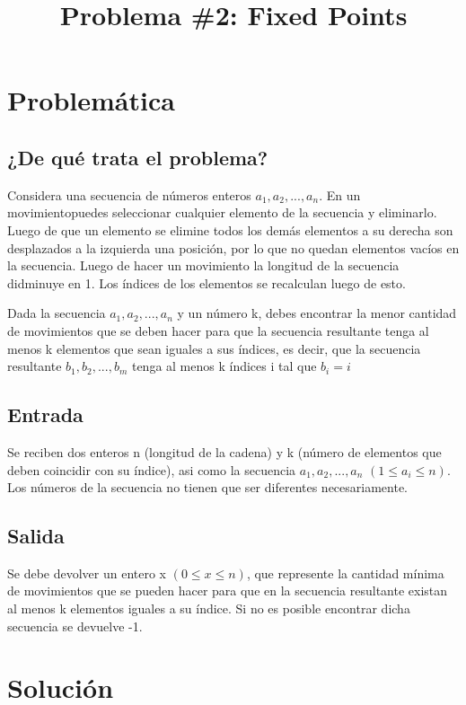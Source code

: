 \documentclass[11pt]{article}
\title{Problema \#2: Fixed Points}
\begin{document}
    \maketitle
    \newpage

    \tableofcontents
    \newpage

    \section{Problemática}
    \subsection{¿De qué trata el problema?}
    Considera una secuencia de números enteros $a_1, a_2, ... , a_n$. En un movimientopuedes seleccionar 
    cualquier elemento de la secuencia y eliminarlo. Luego de que un elemento se elimine todos los demás 
    elementos a su derecha son desplazados a la izquierda una posición, por lo que no quedan elementos vacíos 
    en la secuencia. Luego de hacer un movimiento la longitud de la secuencia didminuye en 1. Los índices 
    de los elementos se recalculan luego de esto.

    Dada la secuencia $a_1, a_2, ... , a_n$ y un número k, debes encontrar la menor cantidad de movimientos 
    que se deben hacer para que la secuencia resultante tenga al menos k elementos que sean iguales a sus 
    índices, es decir, que la secuencia resultante $b_1, b_2, ... , b_m$ tenga al menos k índices i tal que 
    $b_i = i$

    \subsection{Entrada}
    Se reciben dos enteros n (longitud de la cadena) y k (número de elementos que deben coincidir con su índice),
    asi como la secuencia $a_1, a_2, ... , a_n$ $(1 \leq a_i \leq n)$. Los números de la secuencia no tienen 
    que ser diferentes necesariamente.
    
    \subsection{Salida}
    Se debe devolver un entero x $(0 \leq x \leq n)$, que represente la cantidad mínima de movimientos que se
    pueden hacer para que en la secuencia resultante existan al menos k elementos iguales a su índice. Si no
    es posible encontrar dicha secuencia se devuelve -1.

    \section{Solución}
\end{document}
